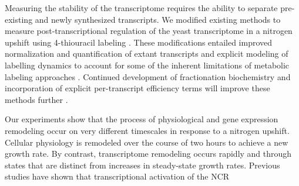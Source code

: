 {Measuring the stability of the transcriptome requires the ability to
separate pre-existing and newly synthesized transcripts. We modified
existing methods to measure 
post-transcriptional regulation of the yeast transcriptome in a
nitrogen upshift using 4-thiouracil labeling
\parencite{miller2011dynamic,neymotin2014determination,munchel2011dynamic}. These
modifications entailed improved normalization and quantification of
extant transcripts and explicit modeling of labelling dynamics to
account for some of the inherent limitations of metabolic labeling
approaches \parencite{perez2013eukaryotic}. Continued development of
fractionation biochemistry \parencite{duffy2015tracking} and incorporation of
explicit per-transcript efficiency terms will improve these
methods further \parencite{chan2017non}.

Our experiments show that the process of physiological and gene
expression remodeling occur on very different timescales in response
to a nitrogen upshift. Cellular physiology is remodeled over the
course of two hours to achieve a new growth rate.
By contrast, transcriptome remodeling occurs rapidly and through
states that are distinct
from increases in steady-state growth rates. 
Previous studies have shown that transcriptional activation of the NCR
}

